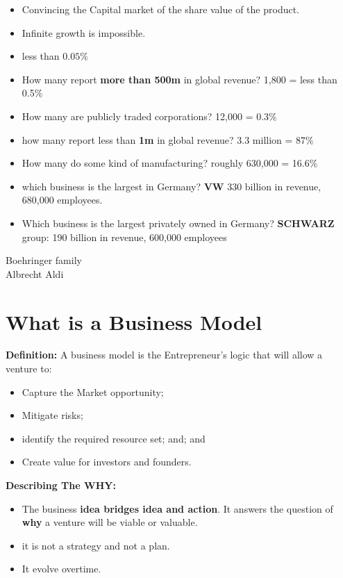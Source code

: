\documentclass[11pt, a4paper]{article}
\begin{document}
\begin{itemize}
  \item Convincing the Capital market of the share value of the product.
  \item Infinite growth is impossible.
  \item less than $0.05\%$
\end{itemize}

\begin{itemize}
  \item How many report  \textbf{more than 500m} in global revenue? 1,800 = less than 0.5\%
  \item How many are publicly traded corporations? 12,000 = 0.3\%
  \item how many report less than  \textbf{1m} in global revenue? 3.3 million = 87\%
  \item How many do some kind of manufacturing? roughly 630,000 = 16.6\%

  \item which business is the largest in Germany? \textbf{VW} 330 billion in revenue, 680,000
        employees.
  \item Which business is the largest privately owned in Germany? \textbf{SCHWARZ} group:
        190 billion in revenue, 600,000 employees\\
\end{itemize}

\noindent Boehringer family \\
Albrecht Aldi

\section{What is a Business Model}
\textbf{Definition:} A business model is the Entrepreneur's logic that will allow a venture to:
\begin{itemize}
  \item Capture the Market opportunity;
  \item Mitigate risks;
  \item identify the required resource set; and; and
  \item Create value for investors and founders.
\end{itemize}

\noindent\textbf{Describing The WHY:}
\begin{itemize}
  \item The business \textbf{idea bridges idea and action}.
        It answers the question of  \textbf{why} a venture will be viable or valuable.
  \item it is not a strategy and not a plan.
  \item It evolve overtime.
\end{itemize}
\end{document}

